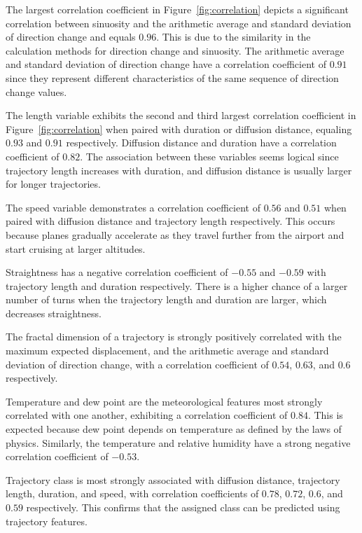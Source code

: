 \let\LaTeXcline\cline\documentclass[sn-mathphys-num]{sn-jnl}\let\cline\LaTeXcline
\begin{document}
The largest correlation coefficient in Figure~\ref{fig:correlation} depicts a significant correlation between sinuosity and the arithmetic average and standard deviation of direction change and equals $0.96$. This is due to the similarity in the calculation methods for direction change and sinuosity. The arithmetic average and standard deviation of direction change have a correlation coefficient of $0.91$ since they represent different characteristics of the same sequence of direction change values.

The length variable exhibits the second and third largest correlation coefficient in Figure~\ref{fig:correlation} when paired with duration or diffusion distance, equaling $0.93$ and $0.91$ respectively. Diffusion distance and duration have a correlation coefficient of $0.82$. The association between these variables seems logical since trajectory length increases with duration, and diffusion distance is usually larger for longer trajectories.

The speed variable demonstrates a correlation coefficient of $0.56$ and $0.51$ when paired with diffusion distance and trajectory length respectively. This occurs because planes gradually accelerate as they travel further from the airport and start cruising at larger altitudes.

Straightness has a negative correlation coefficient of $-0.55$ and $-0.59$ with trajectory length and duration respectively. There is a higher chance of a larger number of turns when the trajectory length and duration are larger, which decreases straightness.

The fractal dimension of a trajectory is strongly positively correlated with the maximum expected displacement, and the arithmetic average and standard deviation of direction change, with a correlation coefficient of $0.54$, $0.63$, and $0.6$ respectively.
 
Temperature and dew point are the meteorological features most strongly correlated with one another, exhibiting a correlation coefficient of $0.84$. This is expected because dew point depends on temperature as defined by the laws of physics. Similarly, the temperature and relative humidity have a strong negative correlation coefficient of $-0.53$.

Trajectory class is most strongly associated with diffusion distance, trajectory length, duration, and speed, with correlation coefficients of $0.78$, $0.72$, $0.6$, and $0.59$ respectively. This confirms that the assigned class can be predicted using trajectory features.
\end{document}
